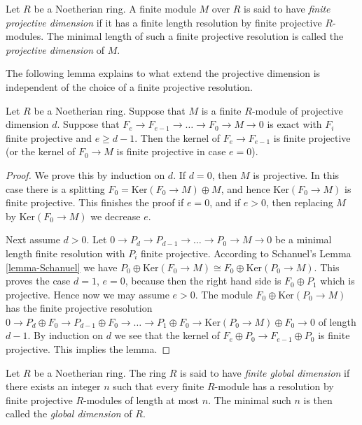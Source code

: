 \begin{definition}
\label{definition-finite-proj-dim}
Let $R$ be a Noetherian ring.
A finite module $M$ over $R$ is said to have {\it finite
projective dimension} if it has a finite length resolution by finite
projective $R$-modules. The minimal length of such a
finite projective resolution is called the {\it projective
dimension} of $M$.
\end{definition}

\noindent
The following lemma explains to what extend the projective
dimension is independent of the choice of a finite projective
resolution.

\begin{lemma}
\label{lemma-independent-resolution}
Let $R$ be a Noetherian ring.
Suppose that $M$ is a finite $R$-module
of projective dimension $d$.
Suppose that $F_e \to F_{e-1} \to \ldots \to F_0 \to M \to 0$
is exact with $F_i$ finite projective and $e \geq d - 1$.
Then the kernel of $F_e \to F_{e-1}$ is finite projective
(or the kernel of $F_0 \to M$ is finite projective in case
$e = 0$).
\end{lemma}

\begin{proof}
We prove this by induction on $d$. If $d = 0$, then
$M$ is projective. In this case there is a splitting
$F_0 = \text{Ker}(F_0 \to M) \oplus M$, and hence
$\text{Ker}(F_0 \to M)$ is finite projective. This finishes
the proof if $e = 0$, and if $e > 0$, then replacing
$M$ by $\text{Ker}(F_0 \to M)$ we decrease $e$.

\medskip\noindent
Next assume $d > 0$.
Let $0 \to P_d \to P_{d-1} \to \ldots \to P_0 \to M \to 0$
be a minimal length finite resolution with $P_i$ finite projective.
According to Schanuel's Lemma \ref{lemma-Schanuel} we have
$P_0 \oplus \text{Ker}(F_0 \to M) \cong F_0 \oplus \text{Ker}(P_0 \to M)$.
This proves the case $d = 1$, $e = 0$, because then the right
hand side is $F_0 \oplus P_1$ which is projective. Hence now we may
assume $e > 0$. The module
$F_0 \oplus \text{Ker}(P_0 \to M)$ has the finite projective resolution
$0 \to P_d \oplus F_0 \to P_{d-1} \oplus F_0 \to \ldots \to P_1 \oplus F_0
\to \text{Ker}(P_0 \to M) \oplus F_0 \to 0$ of length $d - 1$.
By induction on $d$ we see that the kernel of
$F_{e} \oplus P_0 \to F_{e-1} \oplus P_0$ is finite projective.
This implies the lemma.
\end{proof}

\begin{definition}
\label{definition-finite-gl-dim}
Let $R$ be a Noetherian ring. The ring
$R$ is said to have {\it finite global dimension}
if there exists an integer $n$ such that
every finite $R$-module has a resolution by finite
projective $R$-modules of length at most $n$.
The minimal such $n$ is then called the {\it global dimension}
of $R$.
\end{definition}

